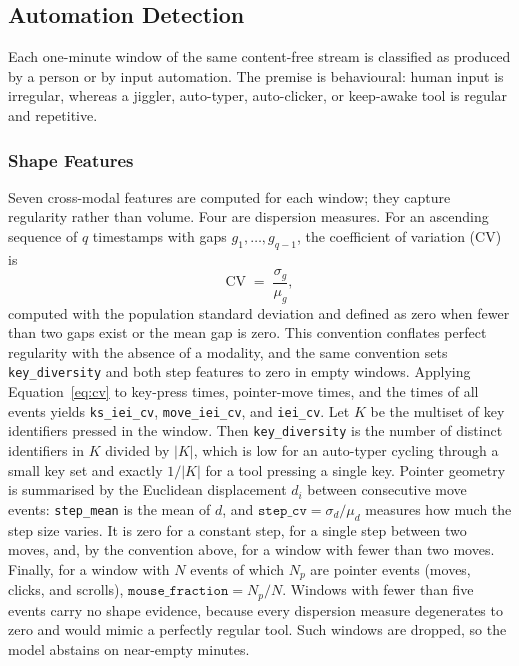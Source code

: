 \documentclass[sensors,article,submit,pdftex,oneauthor]{Definitions/mdpi}
\begin{document}
\subsection{Automation Detection}
\label{sec:method}

Each one-minute window of the same content-free stream is classified as produced by a person or by input automation. The premise is behavioural: human input is irregular, whereas a jiggler, auto-typer, auto-clicker, or keep-awake tool is regular and repetitive.

\subsubsection{Shape Features}
Seven cross-modal features are computed for each window; they capture regularity rather than volume. Four are dispersion measures. For an ascending sequence of $q$ timestamps with gaps $g_1, \dots, g_{q-1}$, the coefficient of variation (CV) is
\begin{equation}
\mathrm{CV} \;=\; \frac{\sigma_g}{\mu_g},
\label{eq:cv}
\end{equation}
computed with the population standard deviation and defined as zero when fewer than two gaps exist or the mean gap is zero. This convention conflates perfect regularity with the absence of a modality, and the same convention sets \texttt{key\_diversity} and both step features to zero in empty windows. Applying Equation~\eqref{eq:cv} to key-press times, pointer-move times, and the times of all events yields \texttt{ks\_iei\_cv}, \texttt{move\_iei\_cv}, and \texttt{iei\_cv}. Let $K$ be the multiset of key identifiers pressed in the window. Then \texttt{key\_diversity} is the number of distinct identifiers in $K$ divided by $|K|$, which is low for an auto-typer cycling through a small key set and exactly $1/|K|$ for a tool pressing a single key. Pointer geometry is summarised by the Euclidean displacement $d_i$ between consecutive move events: \texttt{step\_mean} is the mean of $d$, and $\texttt{step\_cv} = \sigma_d/\mu_d$ measures how much the step size varies. It is zero for a constant step, for a single step between two moves, and, by the convention above, for a window with fewer than two moves. Finally, for a window with $N$ events of which $N_p$ are pointer events (moves, clicks, and scrolls), $\texttt{mouse\_fraction} = N_p/N$. Windows with fewer than five events carry no shape evidence, because every dispersion measure degenerates to zero and would mimic a perfectly regular tool. Such windows are dropped, so the model abstains on near-empty minutes.
\end{document}
